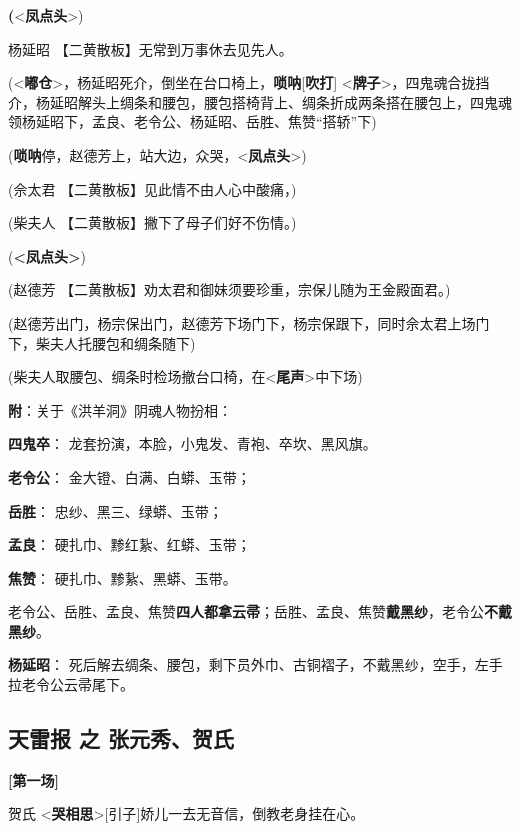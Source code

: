 \textbf{(}\textless{}\textbf{凤点头}\textgreater{})

杨延昭 【二黄散板】无常到万事休去见先人。

(\textless{}\textbf{嘟仓}\textgreater{}，杨延昭死介，倒坐在台口椅上，\textbf{唢呐}{[}\textbf{吹打}{]}
\textless{}\textbf{牌子}\textgreater{}，四鬼魂合拢挡介，杨延昭解头上绸条和腰包，腰包搭椅背上、绸条折成两条搭在腰包上，四鬼魂领杨延昭下，孟良、老令公、杨延昭、岳胜、焦赞``搭轿''下)

(\textbf{唢呐}停，赵德芳上，站大边，众哭，\textless{}\textbf{凤点头}\textgreater{})

(佘太君 【二黄散板】见此情不由人心中酸痛，)

(柴夫人 【二黄散板】撇下了母子们好不伤情。)

(\textbf{\textless{}凤点头\textgreater{}})

(赵德芳 【二黄散板】劝太君和御妹须要珍重，宗保儿随为王金殿面君。)

(赵德芳出门，杨宗保出门，赵德芳下场门下，杨宗保跟下，同时佘太君上场门下，柴夫人托腰包和绸条随下)

(柴夫人取腰包、绸条时检场撤台口椅，在\textless{}\textbf{尾声}\textgreater{}中下场)

\textbf{附}：关于《洪羊洞》阴魂人物扮相：

\textbf{四鬼卒}： 龙套扮演，本脸，小鬼发、青袍、卒坎、黑风旗。

\textbf{老令公}： 金大镫、白满、白蟒、玉带；

\textbf{岳胜}： 忠纱、黑三、绿蟒、玉带；

\textbf{孟良}： 硬扎巾、黪红紥、红蟒、玉带；

\textbf{焦赞}： 硬扎巾、黪紥、黑蟒、玉带。

老令公、岳胜、孟良、焦赞\textbf{四人都拿云帚}；岳胜、孟良、焦赞\textbf{戴黑纱}，老令公\textbf{不戴黑纱}。

\textbf{杨延昭}：
死后解去绸条、腰包，剩下员外巾、古铜褶子，不戴黑纱，空手，左手拉老令公云帚尾下。

\hypertarget{ux5929ux96f7ux62a5-ux4e4b-ux5f20ux5143ux79c0ux8d3aux6c0f}{%
\subsection{天雷报 之
张元秀、贺氏}\label{ux5929ux96f7ux62a5-ux4e4b-ux5f20ux5143ux79c0ux8d3aux6c0f}}

\textbf{{[}第一场{]}}

贺氏
\textless{}\textbf{哭相思}\textgreater{}{[}引子{]}娇儿一去无音信，倒教老身挂在心。

